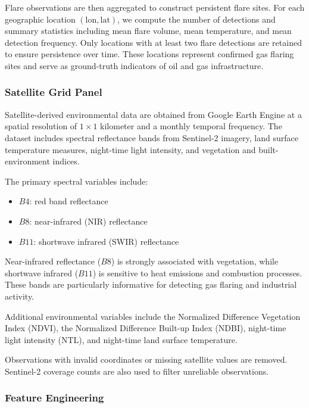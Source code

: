 \documentclass[12pt]{article}
\begin{document}
Flare observations are then aggregated to construct persistent flare sites. For each geographic location $(\text{lon}, \text{lat})$, we compute the number of detections and summary statistics including mean flare volume, mean temperature, and mean detection frequency. Only locations with at least two flare detections are retained to ensure persistence over time. These locations represent confirmed gas flaring sites and serve as ground-truth indicators of oil and gas infrastructure.

\subsubsection{Satellite Grid Panel}

Satellite-derived environmental data are obtained from Google Earth Engine at a spatial resolution of $1 \times 1$ kilometer and a monthly temporal frequency. The dataset includes spectral reflectance bands from Sentinel-2 imagery, land surface temperature measures, night-time light intensity, and vegetation and built-environment indices.

The primary spectral variables include:

\begin{itemize}
\item $B4$: red band reflectance
\item $B8$: near-infrared (NIR) reflectance
\item $B11$: shortwave infrared (SWIR) reflectance
\end{itemize}

Near-infrared reflectance ($B8$) is strongly associated with vegetation, while shortwave infrared ($B11$) is sensitive to heat emissions and combustion processes. These bands are particularly informative for detecting gas flaring and industrial activity.

Additional environmental variables include the Normalized Difference Vegetation Index (NDVI), the Normalized Difference Built-up Index (NDBI), night-time light intensity (NTL), and night-time land surface temperature.

Observations with invalid coordinates or missing satellite values are removed. Sentinel-2 coverage counts are also used to filter unreliable observations.

\subsubsection{Feature Engineering}
\end{document}
